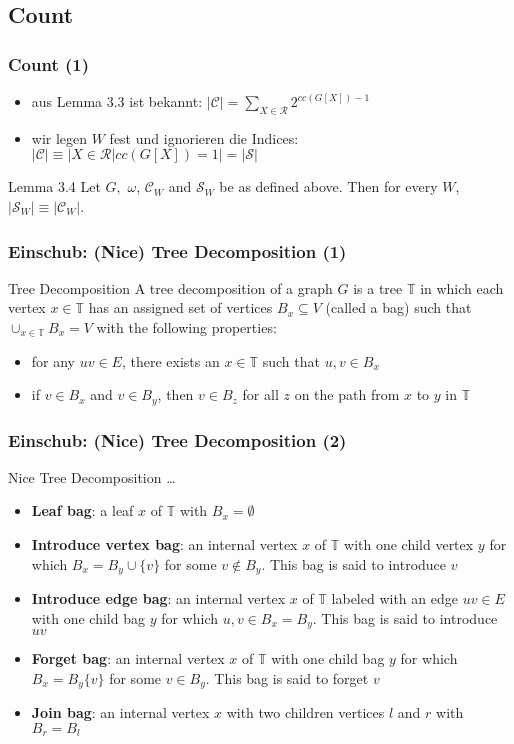 \documentclass{beamer}
\begin{document}
\subsection{Count}
\begin{frame}
\frametitle{Count (1)}
\begin{itemize}
\item aus Lemma 3.3 ist bekannt: $|\mathcal{C}|=\sum_{X \in \mathcal{R}} 2^{cc(G[X])-1}$
\item wir legen $W$ fest und ignorieren die Indices: $|\mathcal{C}| \equiv |{X \in \mathcal{R} |cc(G[X]) = 1}| = |\mathcal{S}|$
\end{itemize}
\begin{block}{Lemma 3.4}
Let $G,$ $\omega$, $\mathcal{C}_W$ and $\mathcal{S}_W$ be as defined above. Then for every $W$, $|\mathcal{S}_W| \equiv |\mathcal{C}_W|$.
\end{block}
\end{frame}
\begin{frame}
\frametitle{Einschub: (Nice) Tree Decomposition (1)}
\begin{block}{Tree Decomposition}
A tree decomposition of a graph $G$ is a tree $\mathbb{T}$ in which each vertex $x \in \mathbb{T}$ has an assigned set of vertices $B_x \subseteq V$ (called a bag) such that $\cup_{x \in \mathbb{T}} B_x = V$ with the following properties:
\begin{itemize}
\item for any $uv \in E$, there exists an $x \in \mathbb{T}$ such that $u,v \in B_x$
\item if $v \in B_x$ and $v \in B_y$, then $v \in B_z$ for all $z$ on the path from $x$ to $y$ in $\mathbb{T}$
\end{itemize}
\end{block}

\end{frame}
\begin{frame}
\frametitle{Einschub: (Nice) Tree Decomposition (2)}
\begin{block}{Nice Tree Decomposition}
\dots
\begin{itemize}
\item \textbf{Leaf bag}: a leaf $x$ of $\mathbb{T}$ with $B_x=\emptyset$
\item \textbf{Introduce vertex bag}: an internal vertex $x$ of $\mathbb{T}$ with one child vertex $y$ for which $B_x = B_y \cup \{v\}$ for some $v \notin B_y$. This bag is said to introduce $v$
\item \textbf{Introduce edge bag}: an internal vertex $x$ of $\mathbb{T}$ labeled with an edge $uv \in E$ with one child bag $y$ for which $u,v \in B_x = B_y$. This bag is said to introduce $uv$
\item \textbf{Forget bag}: an internal vertex $x$ of $\mathbb{T}$ with one child bag $y$ for which $B_x=B_y \{v\}$ for some $v \in B_y$. This bag is said to forget $v$
\item \textbf{Join bag}: an internal vertex $x$ with two children vertices $l$ and $r$ with $B_r=B_l$
\end{itemize}
\end{block}

\end{frame}
\end{document}
